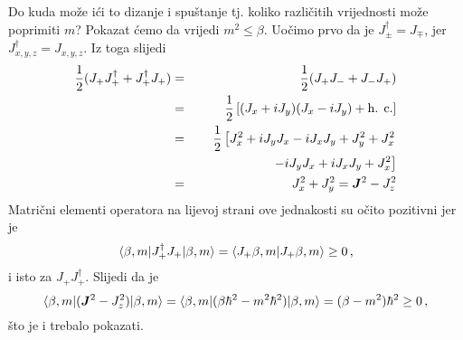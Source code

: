Do kuda  može ići to dizanje i spuštanje tj. koliko različitih vrijednosti
može poprimiti $m$?
Pokazat ćemo da vrijedi $m^2 \leq \beta$.
Uočimo prvo da je $J_{\pm}^{\dagger}=J_{\mp}$, jer $J^{\dagger}_{x,y,z}=J_{x,y,z}$.
Iz toga slijedi
\begin{eqnarray*}
 \frac{1}{2}(J_+ J_{+}^{\dagger} + J_{+}^{\dagger}J_+)& = &
 \frac{1}{2}(J_+ J_{-}+ J_- J_+) \\
& = & \frac{1}{2} \left[ (J_x + i J_y)(J_x - i J_y) + \textrm{h. c.} \right]
\\ & = & \frac{1}{2} \left[ J_{x}^2 + i J_y J_x - i J_x J_y + J_{y}^2
  + J_{x}^2 \right. \\
   & & \qquad \qquad \qquad \left. - i J_y J_x + i J_x J_y + J_{x}^2 \right] \\
& = & J_{x}^2 + J_{y}^2 = \jsq - J_{z}^2
\end{eqnarray*}
Matrični elementi operatora na lijevoj strani ove jednakosti su očito
pozitivni jer je
\begin{displaymath}
\langle \beta, m |J_{+}^{\dagger}J_+ | \beta, m \rangle =
\langle J_{+}\beta, m |J_{+}\beta, m\rangle  \geq 0 \,,
\end{displaymath}
i isto za $J_+ J_{+}^{\dagger}$.
Slijedi da je
\begin{displaymath}
\bra{\beta, m}(\jsq - J_{z}^2)\ket{\beta, m}=
\bra{\beta, m}(\beta\hbar^2 - m^2\hbar^2)\ket{\beta, m} =
(\beta - m^2)\hbar^2 \geq 0 \,,
\end{displaymath}
što je i trebalo pokazati.

